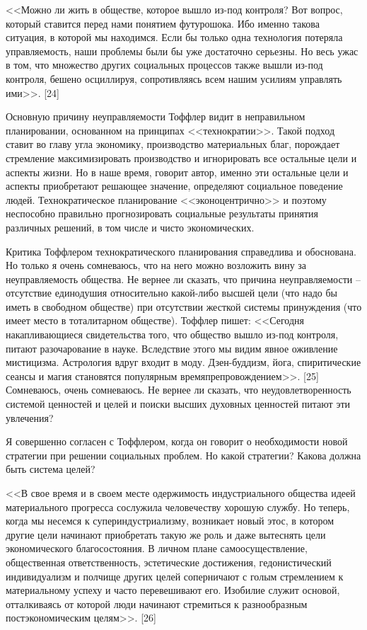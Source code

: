\documentclass{book}
\begin{document}
<<Можно ли жить в обществе, которое вышло из-под конт­роля? Вот вопрос, который ставится перед нами понятием футурошока. Ибо именно такова ситуация, в которой мы находим­ся. Если бы только одна технология потеряла управляемость, наши проблемы были бы уже достаточно серьезны. Но весь ужас в том, что множество других социальных процессов также вышли из-под контроля, бешено осциллируя, сопротивляясь всем нашим усилиям управлять ими>>. [24]

Основную причину неуправляемости Тоффлер видит в непра­вильном планировании, основанном на принципах <<технократии>>. Такой подход ставит во главу угла экономику, произ­водство материальных благ, порождает стремление максимизи­ровать производство и игнорировать все остальные цели и ас­пекты жизни. Но в наше время, говорит автор, именно эти остальные цели и аспекты приобретают решающее значение, опре­деляют социальное поведение людей. Технократическое плани­рование <<эконоцентрично>> и поэтому неспособно правильно прогнозировать социальные результаты принятия различных ре­шений, в том числе и чисто экономических.

Критика Тоффлером технократического планирования спра­ведлива и обоснована. Но только я очень сомневаюсь, что на не­го можно возложить вину за неуправляемость общества. Не вер­нее ли сказать, что причина неуправляемости -- отсутствие еди­нодушия относительно какой-либо высшей цели (что надо бы иметь в свободном обществе) при отсутствии жесткой систе­мы принуждения (что имеет место в тоталитарном обществе). Тоффлер пишет: <<Сегодня накапливающиеся свидетельства того, что общество вышло из-под контроля, питают разочаро­вание в науке. Вследствие этого мы видим явное оживление мистицизма. Астрология вдруг входит в моду. Дзен-буддизм, йога, спиритические сеансы и магия становятся популярным времяпрепровождением>>. [25] Сомневаюсь, очень сомневаюсь. Не вернее ли сказать, что неудовлетворенность системой ценно­стей и целей и поиски высших духовных ценностей питают эти увлечения?

Я совершенно согласен с Тоффлером, когда он говорит о необходимости новой стратегии при решении социальных проб­лем. Но какой стратегии? Какова должна быть система целей?

<<В свое время и в своем месте одержимость индустриально­го общества идеей материального прогресса сослужила челове­честву хорошую службу. Но теперь, когда мы несемся к супер­индустриализму, возникает новый этос, в котором другие це­ли начинают приобретать такую же роль и даже вытеснять це­ли экономического благосостояния. В личном плане самоосу­ществление, общественная ответственность, эстетические дости­жения, гедонистический индивидуализм и полчище других це­лей соперничают с голым стремлением к материальному успе­ху и часто перевешивают его. Изобилие служит основой, оттал­киваясь от которой люди начинают стремиться к разнообраз­ным постэкономическим целям>>. [26]
\end{document}
